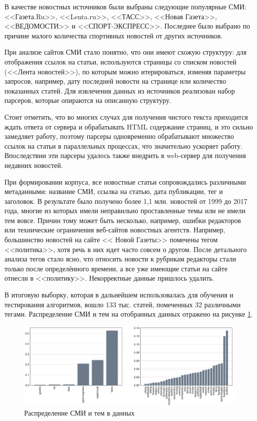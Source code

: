 \documentclass[a4paper, 14pt]{extarticle}
\begin{document}
В качестве новостных источников были выбраны следующие популярные СМИ:
<<Газета.Ru>>, <<Lenta.ru>>, <<ТАСС>>, <<Новая Газета>>, <<ВЕДОМОСТИ>> и <<СПОРТ-ЭКСПРЕСС>>. Последнее было выбрано
по причине малого количества спортивных новостей от других источников.

При анализе сайтов СМИ стало понятно, что они имеют схожую структуру: для отображения ссылок на статьи,
используются страницы со списком новостей (<<Лента новостей>>), по которым можно итерироваться,
изменяя параметры запросов, например, дату последней новости на странице или количество показанных статей.
Для извлечения данных из источников реализован набор парсеров, которые опираются на описанную структуру.

Стоит отметить, что во многих случах для получения чистого текста приходится ждать ответа от сервера и обрабатывать 
HTML содержание страниц, и это сильно замедляет работу, поэтому парсеры одновременно обрабатывают множество ссылок
на статьи в параллельных процессах, что значительно ускоряет работу. Впоследствии эти парсеры удалось также внедрить в 
web-сервер для получения недавних новостей.

При формировании корпуса, все новостные статьи сопровождались различными метаданными: название СМИ, ссылка на статью,
дата публикации, тег и заголовок. В результате было получено более 1,1 млн. новостей от 1999 до 2017 года, многие из 
которых имели неправильно проставленные темы или не имели тем вовсе. Причин тому может быть несколько, например,
ошибки редакторов или технические ограничения веб-сайтов новостных агентств. Например, большинство новостей на сайте <<
Новой Газеты>> помечены тегом <<политика>>, хотя речь в них идет часто совсем о другом. После детального анализа тегов 
стало ясно, что относить новости к рубрикам редакторы стали только после определённого времени, а все уже имеющие 
статьи на сайте отнесли в <<политику>>. Некорректные данные пришлось удалить.

В итоговую выборку, которая в дальнейшем использовалась для обучения и тестирования алгоритмов,
вошло 133 тыс. статей, помеченных 32 различными тегами. Распределение СМИ и тем на отобранных данных отражено на 
рисунке \ref{media_topic_distr}.
\begin{figure}[h!]
	\centering
	\includegraphics[width=1\textwidth]{media_topi_distr.pdf}
	\caption{Распределение СМИ и тем в данных}
	\label{media_topic_distr}
\end{figure}
\end{document}
